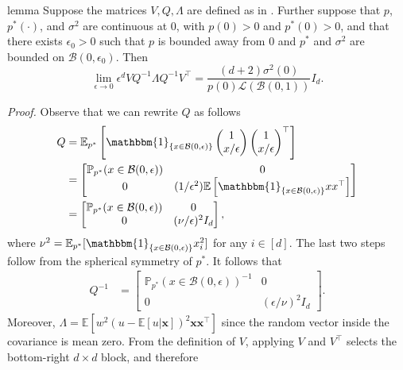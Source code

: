 \documentclass[11pt]{article}
\begin{document}
\begin{appendices}
\begin{restatable}{lemma}{} \label{lemma: asymptotic var bound}
    Suppose the matrices $V, Q, \Lambda$ are defined as in . Further suppose that $p$, $p^*(\cdot)$, and $\sigma^2$ are continuous at $0$, with $p(0)>0$ and $p^*(0)>0$, and that there exists $\epsilon_0>0$ such that $p$ is bounded away from $0$ and $p^*$ and $\sigma^2$ are bounded on $\mathcal{B}(0,\epsilon_0)$. Then
    \[\lim_{\epsilon \rightarrow 0}\epsilon^dVQ^{-1}\Lambda Q^{-1}V^{\top} = \frac{(d+2)\sigma^2(0)}{p(0)\mathcal{L}(\mathcal{B}(0,1))}I_d.\]
\end{restatable}
\noindent \textit{Proof.} Observe that we can rewrite $Q$ as follows
\begin{align*}
    Q &= \mathbb{E}_{p^*}\left[\mathbbm{1}_{\{x \in \mathcal{B}(0, \epsilon)\}}\begin{pmatrix}
        1 \\ x/\epsilon
    \end{pmatrix}\begin{pmatrix}
        1 \\ x/\epsilon
    \end{pmatrix}^{\top}\right] \\
    &= \begin{bmatrix}
         \mathbb{P}_{p^*}(x \in \mathcal{B}(0, \epsilon)) & 0 \\
         0 & (1/\epsilon^2)\mathbb{E}\left[\mathbbm{1}_{\{x \in \mathcal{B}(0, \epsilon)\}}xx^{\top}\right]
    \end{bmatrix} \\
    &= \begin{bmatrix}
         \mathbb{P}_{p^*}(x \in \mathcal{B}(0, \epsilon)) & 0 \\
         0 & (\nu/\epsilon)^2I_d
    \end{bmatrix},
\end{align*}
where $\nu^2 = \mathbb{E}_{p^*}[\mathbbm{1}_{\{x \in \mathcal{B}(0, \epsilon)\}}x_i^2]$ for any $i \in [d]$. The last two steps follow from the spherical symmetry of $p^*$. It follows that
\begin{align} \label{eq: Q closed form}
    Q^{-1} &= \begin{bmatrix}
         \mathbb{P}_{p^*}(x \in \mathcal{B}(0, \epsilon))^{-1} & 0 \\
         0 & (\epsilon/\nu)^{2}I_d
    \end{bmatrix}.
\end{align}
Moreover, $\Lambda = \mathbb{E}[w^2(u - \mathbb{E}[u|\boldsymbol{x}])^2\boldsymbol{x}\boldsymbol{x}^{\top}]$ since the random vector inside the covariance is mean zero. From the definition of $V$, applying $V$ and $V^\top$ selects the bottom-right $d\times d$ block, and therefore

\end{appendices}
\end{document}
